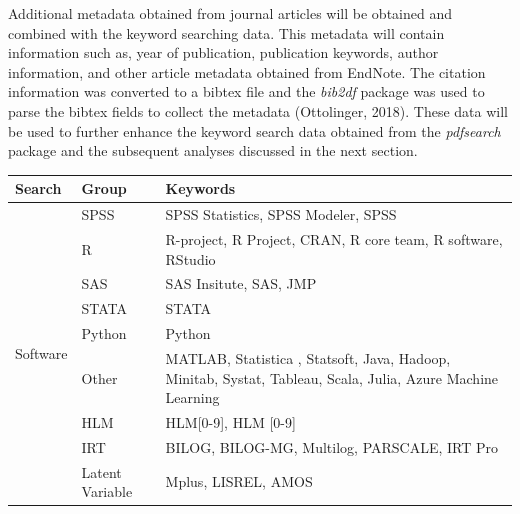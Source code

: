 \documentclass[english,,man]{apa6}
\theoremstyle{definition}
\theoremstyle{definition}
\theoremstyle{definition}
\theoremstyle{remark}
\begin{document}
Additional metadata obtained from journal articles will be obtained and
combined with the keyword searching data. This metadata will contain
information such as, year of publication, publication keywords, author
information, and other article metadata obtained from EndNote. The
citation information was converted to a bibtex file and the
\emph{bib2df} package was used to parse the bibtex fields to collect the
metadata (Ottolinger, 2018). These data will be used to further enhance
the keyword search data obtained from the \emph{pdfsearch} package and
the subsequent analyses discussed in the next section.

\begin{landscape}

\begin{table}
\label{tab:searchwords}
\begin{tabularx}{\linewidth}{llX}

\toprule
Search & Group & Keywords \\
\midrule 

\multirow{9}{*}{Software} & SPSS            & SPSS Statistics, SPSS Modeler, SPSS \\
                          & R               & R-project, R Project, CRAN, R core team, R software, RStudio \\
                          & SAS             & SAS Insitute, SAS, JMP  \\
                          & STATA           & STATA          \\
                          & Python          & Python                  \\
                          & Other           & MATLAB, Statistica , Statsoft, Java, Hadoop, Minitab, Systat, Tableau, Scala, Julia, Azure Machine Learning \\
                          & HLM             & HLM[0-9], HLM [0-9]                            \\
                          & IRT             & BILOG, BILOG-MG, Multilog, PARSCALE, IRT Pro        \\
                          & Latent Variable & Mplus, LISREL, AMOS   \\
\midrule


\end{tabularx}
\end{table}
\end{landscape}
\end{document}
